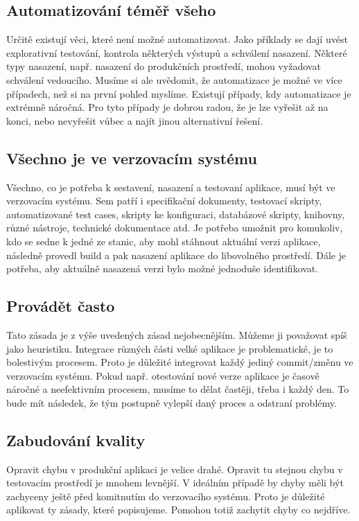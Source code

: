 \subsection{Automatizování téměř všeho}
Určitě existují věci, které není možné automatizovat. Jako příklady se dají uvést explorativní testování, kontrola některých výstupů a schválení nasazení. Některé typy nasazení, např. nasazení do produkčních prostředí, mohou vyžadovat schválení vedoucího. Musíme si ale uvědomit, že automatizace je možné ve více případech, než si na první pohled myslíme. Existují případy, kdy automatizace je extrémně náročná. Pro tyto případy je dobrou radou, že je lze vyřešit až na konci, nebo nevyřešit vůbec a najít jinou alternativní řešení. 

\subsection{Všechno je ve verzovacím systému}
Všechno, co je potřeba k sestavení, nasazení a testovaní aplikace, musí být ve verzovacím systému. Sem patří i specifikační dokumenty, testovací skripty, automatizované test cases, skripty ke konfiguraci, databázové skripty, knihovny, různé nástroje, technické dokumentace atd.
Je potřeba umožnit pro komukoliv, kdo se sedne k jedné ze stanic, aby mohl stáhnout aktuální verzi aplikace, následně provedl build a pak nasazení aplikace do libovolného prostředí. Dále je potřeba, aby aktuálně nasazená verzi bylo možné jednoduše identifikovat.

\subsection{Provádět často}
Tato zásada je z výše uvedených zásad nejobecnějším. Můžeme ji považovat spíš jako heuristiku. Integrace různých části velké aplikace je problematické, je to bolestivým procesem. Proto je důležité integrovat každý jediný commit/změnu ve verzovacím systému. Pokud např. otestování nové verze aplikace je časově náročné a neefektivním procesem, musíme to dělat častěji, třeba i každý den. To bude mít následek, že tým postupně vylepší daný proces a odstraní problémy.

\subsection{Zabudování kvality}
Opravit chybu v produkční aplikaci je velice drahé. Opravit tu stejnou chybu v testovacím prostředí je mnohem levnější. V ideálním případě by chyby měli být zachyceny ještě před komitnutím do verzovacího systému. Proto je důležité aplikovat ty zásady, které popisujeme. Pomohou totiž zachytit chyby co nejdříve.

